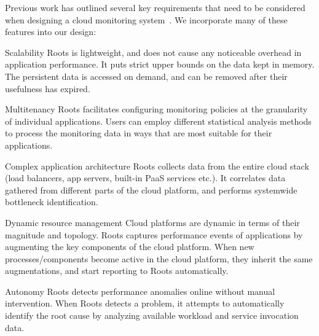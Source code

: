
Previous work has outlined several key requirements that need to be considered when
designing a cloud monitoring system~\cite{DaCunhaRodrigues:2016:MCC:2851613.2851619,Ibidunmoye:2015:PAD:2808687.2791120}. 
We incorporate many of these features into our design:
\begin{LaTeXdescription}
\item[Scalability] Roots is lightweight, and does not cause any noticeable overhead in 
application performance. It puts strict upper bounds on the data kept in memory. 
The persistent data is accessed on demand, and can be removed after their usefulness has expired.
\item[Multitenancy] Roots facilitates configuring monitoring policies at the granularity of individual applications.
Users can employ different statistical analysis methods to process the monitoring data in ways that are 
most suitable for their applications.
\item[Complex application architecture] Roots collects data from the entire cloud stack 
(load balancers, app servers, built-in PaaS services etc.). It correlates data gathered
from different parts of the cloud platform, and performs systemwide bottleneck identification.
\item[Dynamic resource management] Cloud platforms are dynamic in terms of their magnitude 
and topology. Roots captures performance events of applications by augmenting 
the key components of the cloud platform. When new processes/components become active
in the cloud platform, they inherit the same augmentations, and start reporting to Roots automatically.
\item[Autonomy] Roots detects performance anomalies online without manual intervention.
When Roots detects a problem, it attempts to automatically identify the root cause by analyzing
available workload and service invocation data.
\end{LaTeXdescription}

